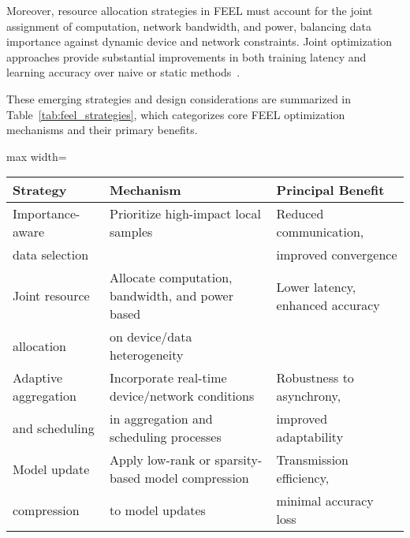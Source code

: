 Moreover, resource allocation strategies in FEEL must account for the joint assignment of computation, network bandwidth, and power, balancing data importance against dynamic device and network constraints. Joint optimization approaches provide substantial improvements in both training latency and learning accuracy over naive or static methods~\cite{ref42}. 

These emerging strategies and design considerations are summarized in Table~\ref{tab:feel_strategies}, which categorizes core FEEL optimization mechanisms and their primary benefits.

\begin{table*}[htbp]
\centering
\caption{Core Optimization Strategies in Federated Edge Learning (FEEL)}
\label{tab:feel_strategies}
\begin{adjustbox}{max width=\textwidth}
\begin{tabular}{lll}
\toprule
\textbf{Strategy}    & \textbf{Mechanism}                                       & \textbf{Principal Benefit}        \\
\midrule
Importance-aware     & Prioritize high-impact local samples                     & Reduced communication,           \\
data selection       &                                                         & improved convergence             \\
Joint resource       & Allocate computation, bandwidth, and power based         & Lower latency, enhanced accuracy \\
allocation           & on device/data heterogeneity                            &                                  \\
Adaptive aggregation & Incorporate real-time device/network conditions          & Robustness to asynchrony,        \\
and scheduling       & in aggregation and scheduling processes                  & improved adaptability            \\
Model update         & Apply low-rank or sparsity-based model compression       & Transmission efficiency,         \\
compression          & to model updates                                        & minimal accuracy loss            \\
\bottomrule
\end{tabular}
\end{adjustbox}
\end{table*}

